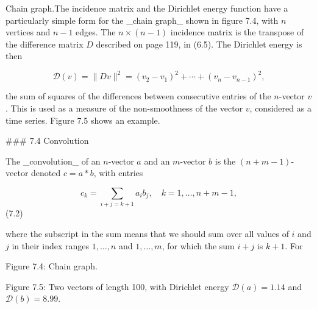 
Chain graph.The incidence matrix and the Dirichlet energy function have a particularly simple form for the _chain graph_ shown in figure 7.4, with \(n\) vertices and \(n-1\) edges. The \(n\times(n-1)\) incidence matrix is the transpose of the difference matrix \(D\) described on page 119, in (6.5). The Dirichlet energy is then

\[\mathcal{D}(v)=\|Dv\|^{2}=(v_{2}-v_{1})^{2}+\cdots+(v_{n}-v_{n-1})^{2},\]

the sum of squares of the differences between consecutive entries of the \(n\)-vector \(v\). This is used as a measure of the non-smoothness of the vector \(v\), considered as a time series. Figure 7.5 shows an example.

### 7.4 Convolution

The _convolution_ of an \(n\)-vector \(a\) and an \(m\)-vector \(b\) is the \((n+m-1)\)-vector denoted \(c=a*b\), with entries

\[c_{k}=\sum_{i+j=k+1}a_{i}b_{j},\quad k=1,\ldots,n+m-1,\] (7.2)

where the subscript in the sum means that we should sum over all values of \(i\) and \(j\) in their index ranges \(1,\ldots,n\) and \(1,\ldots,m\), for which the sum \(i+j\) is \(k+1\). For

Figure 7.4: Chain graph.

Figure 7.5: Two vectors of length 100, with Dirichlet energy \(\mathcal{D}(a)=1.14\) and \(\mathcal{D}(b)=8.99\).

 